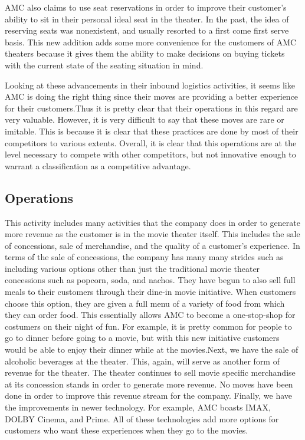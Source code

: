 \documentclass[12pt]{article}
\begin{document}
AMC also claims to use seat reservations in order to improve their customer's ability to sit in their personal ideal seat in the theater. In the past, the idea of reserving seats was nonexistent, and usually resorted to a first come first serve basis. This new addition adds some more convenience for the customers of AMC theaters because it gives them the ability to make decisions on buying tickets with the current state of the seating situation in mind. 

Looking at these advancements in their inbound logistics activities, it seems like AMC is doing the right thing since their moves are providing a better experience for their customers.Thus it is pretty clear that their operations in this regard are very valuable. However, it is very difficult to say that these moves are rare or imitable. This is because it is clear that these practices are done by most of their competitors to various extents. Overall, it is clear that this operations are at the level necessary to compete with other competitors, but not innovative enough to warrant a classification as a competitive advantage.  

\subsection{Operations}
This activity includes many activities that the company does in order to generate more revenue as the customer is in the movie theater itself. This includes the sale of concessions, sale of merchandise, and the quality of a customer's experience. In terms of the sale of concessions, the company has many many strides such as including various options other than just the traditional movie theater concessions such as popcorn, soda, and nachos. They have begun to also sell full meals to their customers through their dine-in movie initiative. When customers choose this option, they are given a full menu of a variety of food from which they can order food. This essentially allows AMC to become a one-stop-shop for costumers on their night of fun. For example, it is pretty common for people to go to dinner before going to a movie, but with this new initiative customers would be able to enjoy their dinner while at the movies.Next, we have the sale of alcoholic beverages at the theater. This, again, will serve as another form of revenue for the theater. The theater continues to sell movie specific merchandise at its concession stands in order to generate more revenue. No moves have been done in order to improve this revenue stream for the company. Finally, we have the improvements in newer technology. For example, AMC boasts IMAX, DOLBY Cinema, and Prime. All of these technologies add more options for customers who want these experiences when they go to the movies. 
\end{document}

